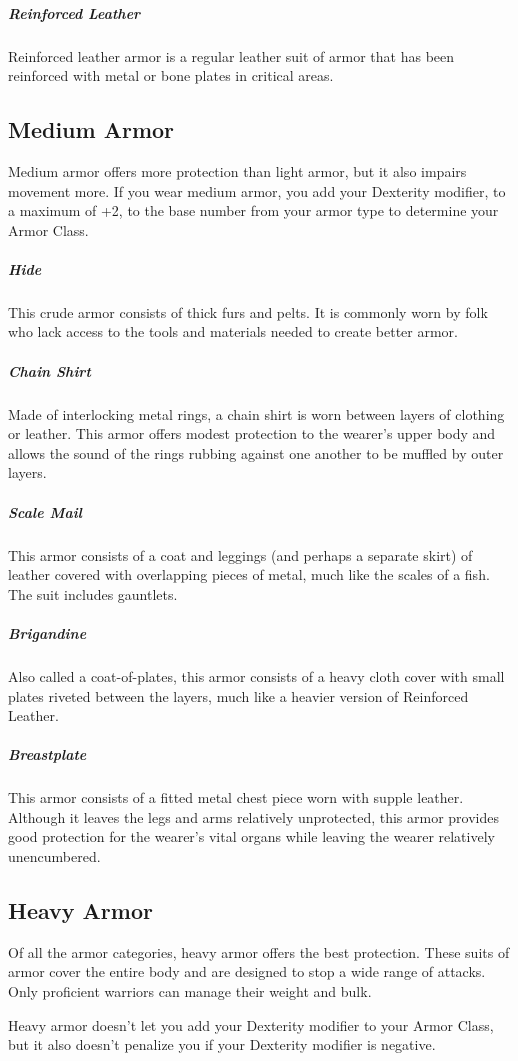 \subparagraph*{Reinforced Leather} Reinforced leather armor is a regular leather suit of armor that has been reinforced with metal or bone plates in critical areas.

\subsection{Medium Armor}

Medium armor offers more protection than light armor, but it also impairs movement more. If you wear medium armor, you add your Dexterity modifier, to a maximum of +2, to the base number from your armor type to determine your Armor Class.

\subparagraph*{Hide} This crude armor consists of thick furs and pelts. It is commonly worn by folk who lack access to the tools and materials needed to create better armor.

\subparagraph*{Chain Shirt} Made of interlocking metal rings, a chain shirt is worn between layers of clothing or leather. This armor offers modest protection to the wearer's upper body and allows the sound of the rings rubbing against one another to be muffled by outer layers.

\subparagraph*{Scale Mail} This armor consists of a coat and leggings (and perhaps a separate skirt) of leather covered with overlapping pieces of metal, much like the scales of a fish. The suit includes gauntlets.

\subparagraph*{Brigandine} Also called a coat-of-plates, this armor consists of a heavy cloth cover with small plates riveted between the layers, much like a heavier version of Reinforced Leather.

\subparagraph*{Breastplate} This armor consists of a fitted metal chest piece worn with supple leather. Although it leaves the legs and arms relatively unprotected, this armor provides good protection for the wearer's vital organs while leaving the wearer relatively unencumbered.

\subsection{Heavy Armor}

Of all the armor categories, heavy armor offers the best protection. These suits of armor cover the entire body and are designed to stop a wide range of attacks. Only proficient warriors can manage their weight and bulk.

Heavy armor doesn't let you add your Dexterity modifier to your Armor Class, but it also doesn't penalize you if your Dexterity modifier is negative.

